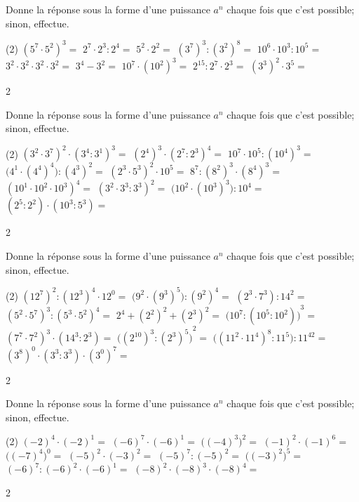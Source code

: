 \documentclass[a4paper,11pt]{report}
\begin{document}
\begin{exop}{%
Donne la réponse sous la forme d'une puissance $a^n$ chaque fois que c'est possible; sinon, effectue.
\begin{tasks}(2)
    \task ${(5^7\cdot5^2)}^3=$ \hrulefill \quad
    \task $2^7\cdot2^3:2^4=$ \hrulefill \quad
    \task $5^2\cdot2^2=$ \hrulefill \quad
    \task ${(3^7)}^3:{(3^2)}^8=$ \hrulefill \quad
    \task $10^6\cdot10^3:10^5 =$ \hrulefill \quad
    \task $3^2\cdot3^2\cdot3^2\cdot3^2 =$ \hrulefill \quad
    \task $3^4-3^2 =$ \hrulefill \quad
    \task $10^7\cdot{(10^2)}^3 =$ \hrulefill \quad
    \task $2^{15}:2^7\cdot2^3 =$ \hrulefill \quad
    \task ${(3^3)}^2\cdot3^5=$ \hrulefill \quad
\end{tasks}
}{2}    
\end{exop}



\begin{exo}{%
Donne la réponse sous la forme d'une puissance $a^n$ chaque fois que c'est possible; sinon, effectue.
\begin{tasks}(2)
    \task ${(3^2\cdot3^7)}^2\cdot{(3^4:3^1)}^3=$
    \task ${(2^4)}^3\cdot{(2^7:2^3)}^4=$
    \task $10^7\cdot10^5:{(10^4)}^3=$
    \task $\big(4^1\cdot{(4^4)}^4\big):{(4^3)}^2=$
    \task ${(2^3\cdot5^3)}^2\cdot10^5=$
    \task $8^7:{(8^2)}^3\cdot{(8^4)}^3=$
    \task ${(10^1\cdot10^2\cdot10^3)}^4=$
    \task ${(3^2\cdot3^3:3^3)}^2=$
    \task $\big(10^2\cdot{(10^3)}^3\big):10^4=$
    \task $(2^5:2^2)\cdot(10^3:5^3)=$
\end{tasks}
}{2}    
\end{exo}



\begin{exo}{%
Donne la réponse sous la forme d'une puissance $a^n$ chaque fois que c'est possible; sinon, effectue.
\begin{tasks}(2)
    \task ${(12^7)}^2:{(12^3)}^4\cdot12^0=$
    \task $\big(9^2\cdot{(9^3)}^5\big):{(9^2)}^4=$
    \task $(2^3\cdot7^3):14^2=$
    \task ${(5^2\cdot5^7)}^3:{(5^3\cdot5^2)}^4=$
    \task $2^4+{(2^2)}^2+{(2^3)}^2 =$
    \task ${\big(10^7:(10^5:10^2)\big)}^3=$
    \task ${(7^7\cdot7^2)}^3\cdot(14^3:2^3)=$
    \task ${\big({(2^{10})}^3:{(2^3)}^5\big)}^2=$
    \task $\big({(11^2\cdot11^4)}^8:11^5\big):11^{42}=$
    \task ${(3^8)}^0\cdot(3^3:3^3)\cdot{(3^0)}^7=$ 
\end{tasks}
}{2}    
\end{exo}


\begin{exop}{%
Donne la réponse sous la forme d'une puissance $a^n$ chaque fois que c'est possible; sinon, effectue.
\begin{tasks}(2)
    \task $(-2)^4\cdot(-2)^1=$
    \task $(-6)^7\cdot(-6)^1=$
    \task $\big((-4)^3\big)^2=$
    \task $(-1)^2\cdot(-1)^6=$
    \task $\big((-7)^4\big)^0=$
    \task $(-5)^2\cdot(-3)^2=$
    \task $(-5)^7:(-5)^2=$
    \task $\big((-3)^2\big)^5=$
    \task $(-6)^7:(-6)^2\cdot(-6)^1=$
    \task $(-8)^2\cdot(-8)^3\cdot(-8)^4=$
\end{tasks}
}{2}    
\end{exop}
\end{document}
